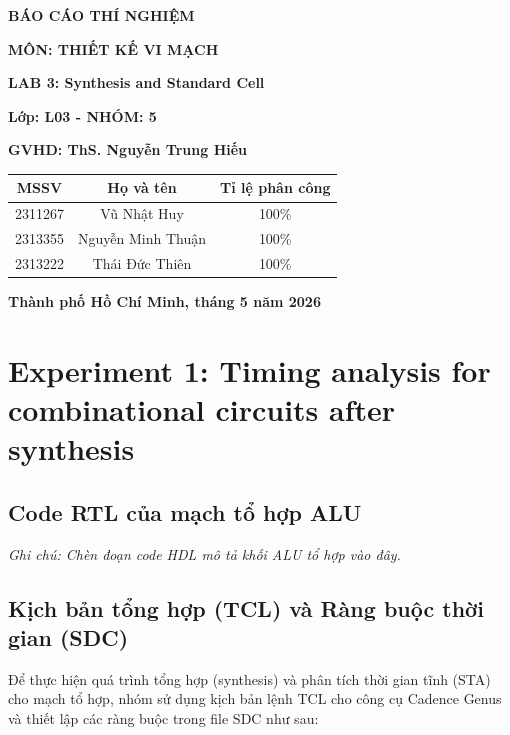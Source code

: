 \documentclass[12pt, a4paper, oneside]{article}
\begin{document}
\begin{titlepage}
\begin{center}
    \fontsize{18pt}{17pt}\selectfont 
    \textbf{BÁO CÁO THÍ NGHIỆM}

    \textbf{MÔN:  THIẾT KẾ VI MẠCH}
\end{center}
\begin{center}
    \fontsize{15pt}{17pt}\selectfont 
    \textbf{\textrm{LAB 3: Synthesis and Standard Cell}}
\end{center}

\begin{center}
    \vspace{15pt}
    \textbf{Lớp: L03 - NHÓM: 5}
    
    \textbf{GVHD: ThS. Nguyễn Trung Hiếu}
\end{center}

\vspace{10pt}

\begin{table}[h!]
\centering
\begin{tabular}{|c|c|c|}
\hline
\textbf{MSSV} & \textbf{Họ và tên} & \textbf{Tỉ lệ phân công} \\ \hline
2311267 & Vũ Nhật Huy & 100\% \\ \hline
2313355 & Nguyễn Minh Thuận & 100\% \\ \hline
2313222 & Thái Đức Thiên & 100\% \\ \hline
\end{tabular}
\end{table}
\vfill
\centerline{\bf Thành phố Hồ Chí Minh, tháng 5 năm 2026}

\vspace{1cm}
\end{titlepage}
\newpage
\tableofcontents
\newpage

\section{Experiment 1: Timing analysis for combinational circuits after synthesis}

\subsection{Code RTL của mạch tổ hợp ALU}
\textit{Ghi chú: Chèn đoạn code HDL mô tả khối ALU tổ hợp vào đây.}

\subsection{Kịch bản tổng hợp (TCL) và Ràng buộc thời gian (SDC)}
Để thực hiện quá trình tổng hợp (synthesis) và phân tích thời gian tĩnh (STA) cho mạch tổ hợp, nhóm sử dụng kịch bản lệnh TCL cho công cụ Cadence Genus và thiết lập các ràng buộc trong file SDC như sau:
\end{document}
